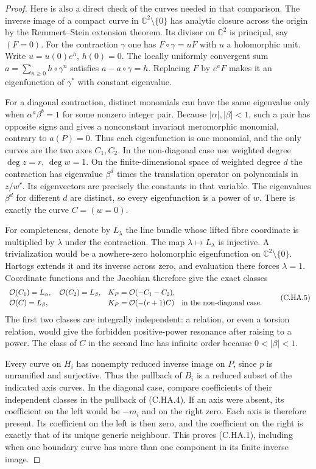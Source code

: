 \begin{proof}
Here is also a direct check of the curves needed in that
comparison. The inverse image of a compact curve in
$\mathbb C^2\setminus\{0\}$ has analytic closure across
the origin by the Remmert--Stein extension theorem. Its
divisor on $\mathbb C^2$ is principal, say $(F=0)$.
For the contraction $\gamma$ one has
$F\circ\gamma=uF$ with $u$ a holomorphic unit. Write
$u=u(0)e^h$, $h(0)=0$. The locally uniformly convergent sum
$a=\sum_{n\geq0}h\circ\gamma^n$ satisfies
$a-a\circ\gamma=h$. Replacing $F$ by $e^aF$ makes it an
eigenfunction of $\gamma^*$ with constant eigenvalue.

For a diagonal contraction, distinct monomials can have
the same eigenvalue only when $\alpha^a\beta^b=1$ for
some nonzero integer pair. Because $|\alpha|,|\beta|<1$,
such a pair has opposite signs and gives a nonconstant
invariant meromorphic monomial, contrary to $a(P)=0$.
Thus each eigenfunction is one monomial, and the only
curves are the two axes $C_1,C_2$. In the non-diagonal
case use weighted degree $\deg z=r$, $\deg w=1$.
On the finite-dimensional space of weighted degree $d$
the contraction has eigenvalue $\beta^d$ times the
translation operator on polynomials in $z/w^r$.
Its eigenvectors are precisely the constants in that
variable. The eigenvalues $\beta^d$ for different $d$
are distinct, so every eigenfunction is a power of $w$.
There is exactly the curve $C=(w=0)$.

For completeness, denote by $L_\lambda$ the line bundle
whose lifted fibre coordinate is multiplied by $\lambda$
under the contraction. The map
$\lambda\mapsto L_\lambda$ is injective. A trivialization
would be a nowhere-zero holomorphic eigenfunction on
$\mathbb C^2\setminus\{0\}$. Hartogs extends it and its
inverse across zero, and evaluation there forces
$\lambda=1$. Coordinate functions and the Jacobian
therefore give the exact classes
\[
\begin{array}{ll}
 \mathcal O(C_1)=L_\alpha,
 \quad\mathcal O(C_2)=L_\beta,
 &K_P=\mathcal O(-C_1-C_2),\\[2pt]
 \mathcal O(C)=L_\beta,
 &K_P=\mathcal O(-(r+1)C)
 \quad\hbox{in the non-diagonal case}.
\end{array}
\tag{C.HA.5}
\]
The first two classes are integrally independent: a relation,
or even a torsion relation, would give the forbidden
positive-power resonance after raising to a power.
The class of $C$ in the second line has infinite order
because $0<|\beta|<1$.

Every curve on $H_i$ has nonempty reduced inverse image
on $P$, since $p$ is unramified and surjective. Thus the
pullback of $B_i$ is a reduced subset of the indicated
axis curves. In the diagonal case, compare coefficients
of their independent classes in the pullback of (C.HA.4).
If an axis were absent, its coefficient on the left
would be $-m_i$ and on the right zero. Each axis is
therefore present. Its coefficient on the left is then
zero, and the coefficient on the right is exactly that
of its unique generic neighbour. This proves (C.HA.1),
including when one boundary curve has more than one
component in its finite inverse image.


\end{proof}
